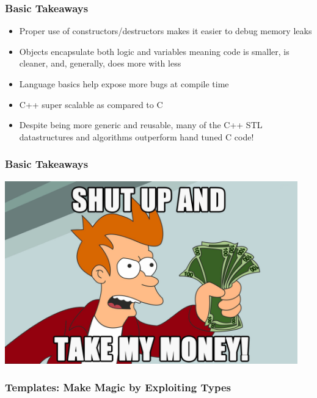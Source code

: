 \documentclass{beamer}
\begin{document}
\begin{frame}
\frametitle{Basic Takeaways}
    \begin{itemize}
            \item Proper use of constructors/destructors makes it easier to debug memory leaks
            \item Objects encapsulate both logic and variables meaning code is smaller, is cleaner, and, generally, does more with less
            \item Language basics help expose more bugs at compile time
            \item C++ super scalable as compared to C
            \item Despite being more generic and reusable, many of the C++ STL datastructures and algorithms outperform hand tuned C code!
    \end{itemize}
\end{frame}
\begin{frame}
\frametitle{Basic Takeaways}
    \includegraphics[width=0.95\textwidth]{shutup.jpg}
\end{frame}
\begin{frame}
\frametitle{Templates: Make Magic by Exploiting Types}

\end{frame}
\end{document}
